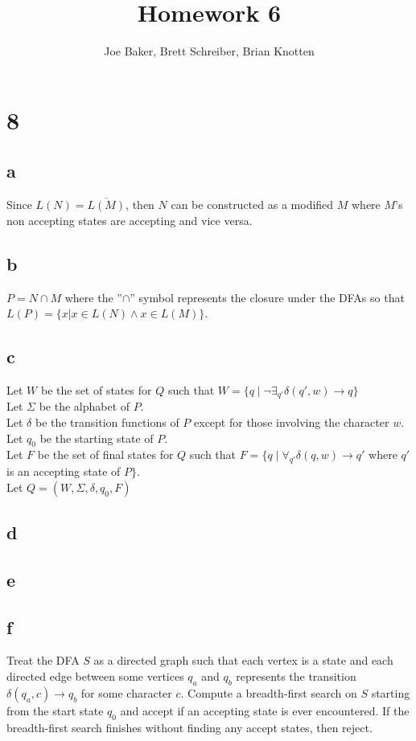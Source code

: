 \documentclass[letterpaper,notitlepage,twoside]{article}
\begin{document}
\title{Homework 6}
\author{Joe Baker, Brett Schreiber, Brian Knotten}
\maketitle

\section*{8}

\subsection*{a}
Since $L(N) = \overline  {L(M)}$, then $N$ can be constructed as a modified $M$ where $M$'s non accepting states are accepting and vice versa.
\subsection*{b}
$P = N \cap M$ where the ''$\cap$'' symbol represents the closure under the DFAs so that $L(P) = \{x | x \in L(N) \land x \in L(M)\}$.
\subsection*{c}
Let $W$ be the set of states for $Q$ such that $W = \{q \mid \neg \exists_{q'} \delta(q', w) \rightarrow q\}$ \\
Let $\Sigma$ be the alphabet of $P$. \\
Let $\delta$ be the transition functions of $P$ except for those involving the character $w$. \\
Let $q_0$ be the starting state of $P$. \\
Let $F$ be the set of final states for $Q$ such that $F = \{q \mid \forall_{q'} \delta(q, w) \rightarrow q'$ where $q'$ is an accepting state of $P\}$. \\
Let $Q = (W, \Sigma, \delta, q_0, F)$
\subsection*{d}

\subsection*{e}

\subsection*{f}
Treat the DFA $S$ as a directed graph such that each vertex is a state and each directed edge between some vertices $q_a$ and $q_b$ represents the transition $\delta(q_a, c) \rightarrow q_b$ for some character $c$. Compute a breadth-first search on $S$ starting from the start state $q_0$ and accept if an accepting state is ever encountered. If the breadth-first search finishes without finding any accept states, then reject. \\
\end{document}
